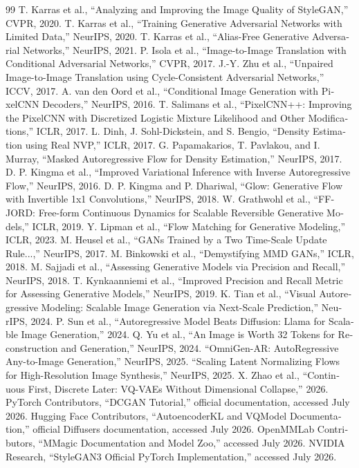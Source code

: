 \documentclass[12pt,openany,oneside]{book}
\begin{document}
\begin{latin}
\begin{thebibliography}{99}
 T. Karras et al., ``Analyzing and Improving the Image Quality of StyleGAN,'' CVPR, 2020.
 T. Karras et al., ``Training Generative Adversarial Networks with Limited Data,'' NeurIPS, 2020.
 T. Karras et al., ``Alias-Free Generative Adversarial Networks,'' NeurIPS, 2021.
 P. Isola et al., ``Image-to-Image Translation with Conditional Adversarial Networks,'' CVPR, 2017.
 J.-Y. Zhu et al., ``Unpaired Image-to-Image Translation using Cycle-Consistent Adversarial Networks,'' ICCV, 2017.
 A. van den Oord et al., ``Conditional Image Generation with PixelCNN Decoders,'' NeurIPS, 2016.
 T. Salimans et al., ``PixelCNN++: Improving the PixelCNN with Discretized Logistic Mixture Likelihood and Other Modifications,'' ICLR, 2017.
 L. Dinh, J. Sohl-Dickstein, and S. Bengio, ``Density Estimation using Real NVP,'' ICLR, 2017.
 G. Papamakarios, T. Pavlakou, and I. Murray, ``Masked Autoregressive Flow for Density Estimation,'' NeurIPS, 2017.
 D. P. Kingma et al., ``Improved Variational Inference with Inverse Autoregressive Flow,'' NeurIPS, 2016.
 D. P. Kingma and P. Dhariwal, ``Glow: Generative Flow with Invertible 1x1 Convolutions,'' NeurIPS, 2018.
 W. Grathwohl et al., ``FFJORD: Free-form Continuous Dynamics for Scalable Reversible Generative Models,'' ICLR, 2019.
 Y. Lipman et al., ``Flow Matching for Generative Modeling,'' ICLR, 2023.
 M. Heusel et al., ``GANs Trained by a Two Time-Scale Update Rule...,'' NeurIPS, 2017.
 M. Binkowski et al., ``Demystifying MMD GANs,'' ICLR, 2018.
 M. Sajjadi et al., ``Assessing Generative Models via Precision and Recall,'' NeurIPS, 2018.
 T. Kynkaanniemi et al., ``Improved Precision and Recall Metric for Assessing Generative Models,'' NeurIPS, 2019.
 K. Tian et al., ``Visual Autoregressive Modeling: Scalable Image Generation via Next-Scale Prediction,'' NeurIPS, 2024.
 P. Sun et al., ``Autoregressive Model Beats Diffusion: Llama for Scalable Image Generation,'' 2024.
 Q. Yu et al., ``An Image is Worth 32 Tokens for Reconstruction and Generation,'' NeurIPS, 2024.
 ``OmniGen-AR: AutoRegressive Any-to-Image Generation,'' NeurIPS, 2025.
 ``Scaling Latent Normalizing Flows for High-Resolution Image Synthesis,'' NeurIPS, 2025.
 X. Zhao et al., ``Continuous First, Discrete Later: VQ-VAEs Without Dimensional Collapse,'' 2026.
 PyTorch Contributors, ``DCGAN Tutorial,'' official documentation, accessed July 2026.
 Hugging Face Contributors, ``AutoencoderKL and VQModel Documentation,'' official Diffusers documentation, accessed July 2026.
 OpenMMLab Contributors, ``MMagic Documentation and Model Zoo,'' accessed July 2026.
 NVIDIA Research, ``StyleGAN3 Official PyTorch Implementation,'' accessed July 2026.
\end{thebibliography}
\end{latin}
\end{document}
